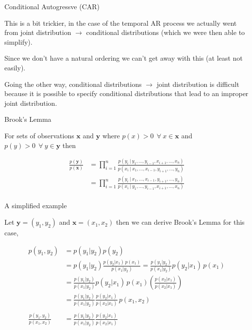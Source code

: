 \documentclass[11pt,ignorenonframetext,]{beamer}
\begin{document}
\begin{frame}[t]{Conditional Autogressve (CAR)}

This is a bit trickier, in the case of the temporal AR process we
actually went from joint distribution \(\to\) conditional distributions
(which we were then able to simplify).

\vspace{3mm}

Since we don't have a natural ordering we can't get away with this (at
least not easily).

\vspace{3mm}

Going the other way, conditional distributions \(\to\) joint
distribution is difficult because it is possible to specify conditional
distributions that lead to an improper joint distribution.

\end{frame}

\begin{frame}[t]{Brook's Lemma}

For sets of observations \(\bm{x}\) and \(\bm{y}\) where
\(p(x) > 0~~\forall ~ x\in\bm{x}\) and
\(p(y) > 0~~\forall ~ y\in\bm{y}\) then

\[\begin{aligned}
\frac{p(\bm{y})}{p(\bm{x})} 
  &= \prod_{i=1}^n \frac{p(y_i ~|~ y_1,\ldots,y_{i-1},x_{i+1},\ldots,x_n)}{p(x_i ~|~ x_1,\ldots,x_{i-1},y_{i+1},\ldots,y_n)} \\
  &= \prod_{i=1}^n \frac{p(y_i ~|~ x_1,\ldots,x_{i-1},y_{i+1},\ldots,y_n)}{p(x_i ~|~ y_1,\ldots,y_{i-1},x_{i+1},\ldots,x_n)} \\
\end{aligned}\]

\end{frame}

\begin{frame}{A simplified example}

Let \(\bm{y} = (y_1,y_2)\) and \(\bm{x} = (x_1,x_2)\) then we can derive
Brook's Lemma for this case,

\[ \begin{aligned}
p (y_1,y_2) 
  &= p(y_1 | y_2) p(y_2) \\
  &= p(y_1 | y_2) \frac{p(y_2|x_1) \, p(x_1)}{p(x_1|y_2)} = \frac{p(y_1 | y_2)}{p(x_1 | y_2)} p(y_2|x_1) \, p(x_1) \\
  & = \frac{p(y_1 | y_2)}{p(x_1 | y_2)} p(y_2|x_1) \, p(x_1) \left(\frac{p(x_2|x_1)}{p(x_2|x_1)}\right) \\
  & = \frac{p(y_1 | y_2)}{p(x_1 | y_2)} \frac{p(y_2|x_1)}{p(x_2|x_1)} \, p(x_1,x_2) \\
\\
\frac{p (y_1,y_2) }{p(x_1,x_2)} 
  & = \frac{p(y_1 | y_2)}{p(x_1 | y_2)} \frac{p(y_2|x_1)}{p(x_2|x_1)}
\end{aligned} \]

\end{frame}
\end{document}
